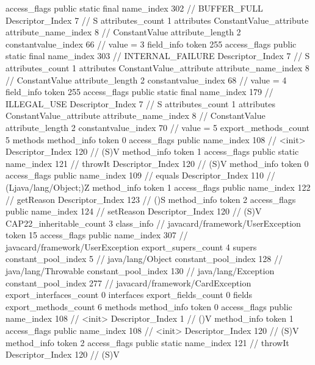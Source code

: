 {{{{{				access_flags	public static final
				name_index	302		// BUFFER_FULL
				Descriptor_Index	7		// S
				attributes_count	1
				attributes {
				ConstantValue_attribute {
					attribute_name_index	8		// ConstantValue
					attribute_length	2
					constantvalue_index	66		// value = 3
				}
				}
			}
			field_info {
				token	255
				access_flags	public static final
				name_index	303		// INTERNAL_FAILURE
				Descriptor_Index	7		// S
				attributes_count	1
				attributes {
				ConstantValue_attribute {
					attribute_name_index	8		// ConstantValue
					attribute_length	2
					constantvalue_index	68		// value = 4
				}
				}
			}
			field_info {
				token	255
				access_flags	public static final
				name_index	179		// ILLEGAL_USE
				Descriptor_Index	7		// S
				attributes_count	1
				attributes {
				ConstantValue_attribute {
					attribute_name_index	8		// ConstantValue
					attribute_length	2
					constantvalue_index	70		// value = 5
				}
				}
			}
			}
			export_methods_count	5
			methods {
				method_info {
					token	0
					access_flags	public
					name_index	108		// <init>
					Descriptor_Index	120		// (S)V
				}
				method_info {
					token	1
					access_flags	public static
					name_index	121		// throwIt
					Descriptor_Index	120		// (S)V
				}
				method_info {
					token	0
					access_flags	public
					name_index	109		// equals
					Descriptor_Index	110		// (Ljava/lang/Object;)Z
				}
				method_info {
					token	1
					access_flags	public
					name_index	122		// getReason
					Descriptor_Index	123		// ()S
				}
				method_info {
					token	2
					access_flags	public
					name_index	124		// setReason
					Descriptor_Index	120		// (S)V
				}
			}
			CAP22_inheritable_count	3
		}
		class_info {		// javacard/framework/UserException
			token	15
			access_flags	public
			name_index	307		// javacard/framework/UserException
			export_supers_count	4
			supers {
				constant_pool_index	5		// java/lang/Object
				constant_pool_index	128		// java/lang/Throwable
				constant_pool_index	130		// java/lang/Exception
				constant_pool_index	277		// javacard/framework/CardException
			}
			export_interfaces_count	0
			interfaces {
			}
			export_fields_count	0
			fields {
			}
			export_methods_count	6
			methods {
				method_info {
					token	0
					access_flags	public
					name_index	108		// <init>
					Descriptor_Index	1		// ()V
				}
				method_info {
					token	1
					access_flags	public
					name_index	108		// <init>
					Descriptor_Index	120		// (S)V
				}
				method_info {
					token	2
					access_flags	public static
					name_index	121		// throwIt
					Descriptor_Index	120		// (S)V
}}}}}
